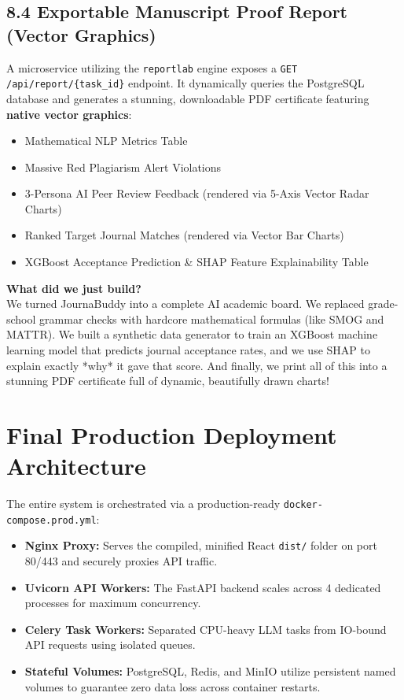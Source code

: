 \documentclass[11pt,a4paper]{article}
\begin{document}
\subsection*{8.4 Exportable Manuscript Proof Report (Vector Graphics)}
A microservice utilizing the \texttt{reportlab} engine exposes a \texttt{GET /api/report/\{task\_id\}} endpoint. It dynamically queries the PostgreSQL database and generates a stunning, downloadable PDF certificate featuring \textbf{native vector graphics}:
\begin{itemize}
    \item Mathematical NLP Metrics Table
    \item Massive Red Plagiarism Alert Violations
    \item 3-Persona AI Peer Review Feedback (rendered via 5-Axis Vector Radar Charts)
    \item Ranked Target Journal Matches (rendered via Vector Bar Charts)
    \item XGBoost Acceptance Prediction \& SHAP Feature Explainability Table
\end{itemize}

\vspace{0.5cm}
\begin{tcolorbox}[colback=blue!5,colframe=blue!40!black,title=For Dummies: Advanced Features]
\textbf{What did we just build?} \\
We turned JournaBuddy into a complete AI academic board. We replaced grade-school grammar checks with hardcore mathematical formulas (like SMOG and MATTR). We built a synthetic data generator to train an XGBoost machine learning model that predicts journal acceptance rates, and we use SHAP to explain exactly *why* it gave that score. And finally, we print all of this into a stunning PDF certificate full of dynamic, beautifully drawn charts!
\end{tcolorbox}

\bigskip

\section{Final Production Deployment Architecture}
The entire system is orchestrated via a production-ready \texttt{docker-compose.prod.yml}:
\begin{itemize}
    \item \textbf{Nginx Proxy:} Serves the compiled, minified React \texttt{dist/} folder on port 80/443 and securely proxies API traffic.
    \item \textbf{Uvicorn API Workers:} The FastAPI backend scales across 4 dedicated processes for maximum concurrency.
    \item \textbf{Celery Task Workers:} Separated CPU-heavy LLM tasks from IO-bound API requests using isolated queues.
    \item \textbf{Stateful Volumes:} PostgreSQL, Redis, and MinIO utilize persistent named volumes to guarantee zero data loss across container restarts.
\end{itemize}
\end{document}
